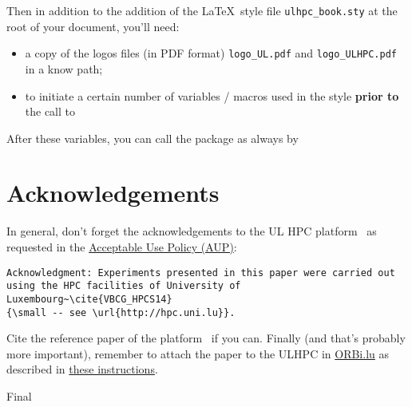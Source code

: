 \documentclass[a4paper,11pt,twoside,a4paper]{book}
\def\reportversion{Final}  %
\begin{document}
Then in addition to the addition of the \LaTeX\ style file \texttt{ulhpc\_book.sty} at the root of your document, you'll need: 

\begin{itemize}
  \item a copy of the logos files (in PDF format) \texttt{logo\_UL.pdf} and \texttt{logo\_ULHPC.pdf} in a know path;
  \item to initiate a certain number of variables / macros used in the style \textbf{prior to} the call to 
\end{itemize}



After these variables, you can call the package as always by 



\chapter{Acknowledgements}

In general, don't forget the  acknowledgements to the UL HPC platform~\cite{VBCG_HPCS14} as requested in the \href{https://hpc.uni.lu/users/AUP.html}{Acceptable Use Policy (AUP)}: 

\begin{verbatim}
Acknowledgment: Experiments presented in this paper were carried out 
using the HPC facilities of University of Luxembourg~\cite{VBCG_HPCS14} 
{\small -- see \url{http://hpc.uni.lu}}.
\end{verbatim}

Cite the reference paper of the platform~\cite{VBCG_HPCS14} if you can. Finally (and that's probably more important), remember to attach the paper to the ULHPC in \href{http://publications.uni.lu/}{ORBi.lu} as described in \href{https://hpc.uni.lu/about/publis.html#acknowledgement-banner-and-orbilu-instructions}{these instructions}.


% 
% 


\newpage
{}


\newpage
\appendix
% 




\backmatter
\ifx\reportversion\printversion
  \makebackpage                  %
\fi
\end{document}
